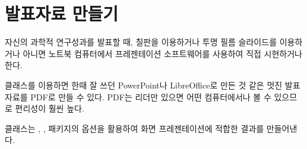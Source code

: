 \section{발표자료 만들기}
\label{sec:beamer}
자신의 과학적 연구성과를 발표할 때, 칠판을 이용하거나 투명 필름 슬라이드를 이용하거나 아니면 노트북 컴퓨터에서 프레젠테이션 소프트웨어를 사용하여 직접 시현하거나 한다.

 클래스를 이용하면 한때 잘 쓰던 PowerPoint나 LibreOffice로 만든 것 같은 멋진 발표자료를 PDF로 만들 수 있다. PDF는 리더만 있으면 어떤 컴퓨터에서나 볼 수 있으므로 편리성이 훨씬 높다.

 클래스는 , ,  패키지의 옵션을 활용하여 화면 프레젠테이션에 적합한 결과를 만들어낸다.




% 

